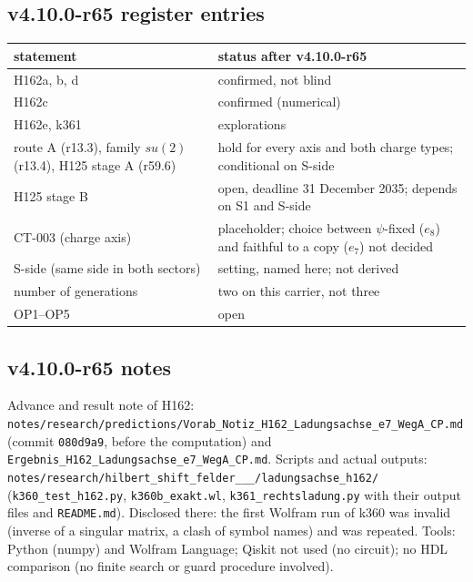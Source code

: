 \subsection*{v4.10.0-r65 register entries}
\label{subsec:v4100-r65-register}

\begin{center}
\small
\begin{tabular}{@{}>{\raggedright\arraybackslash}p{}>{\raggedright\arraybackslash}p{}@{}}
\toprule
statement & status after v4.10.0-r65\\
\midrule
H162a, b, d & confirmed, not blind\\
H162c & confirmed (numerical)\\
H162e, k361 & explorations\\
route A (r13.3), family \(su(2)\) (r13.4), H125 stage A (r59.6) & hold for every axis and both charge types; conditional on S-side\\
H125 stage B & open, deadline 31 December 2035; depends on S1 and S-side\\
CT-003 (charge axis) & placeholder; choice between \(\psi\)-fixed (\(e_8\)) and faithful to a copy (\(e_7\)) not decided\\
S-side (same side in both sectors) & setting, named here; not derived\\
number of generations & two on this carrier, not three\\
OP1--OP5 & open\\
\bottomrule
\end{tabular}
\end{center}

\subsection*{v4.10.0-r65 notes}
\label{subsec:v4100-r65-notes}

{\raggedright
Advance and result note of H162: \texttt{notes/\allowbreak research/\allowbreak predictions/\allowbreak Vorab\_\allowbreak Notiz\_\allowbreak H162\_\allowbreak Ladungsachse\_\allowbreak e7\_\allowbreak WegA\_\allowbreak CP.md}
(commit \texttt{080d9a9}, before the computation) and \texttt{Ergebnis\_\allowbreak H162\_\allowbreak Ladungsachse\_\allowbreak e7\_\allowbreak WegA\_\allowbreak CP.md}.
Scripts and actual outputs: \texttt{notes/\allowbreak research/\allowbreak hilbert\_\allowbreak shift\_\allowbreak felder\_\_\_/\allowbreak ladungsachse\_\allowbreak h162/}
(\texttt{k360\_\allowbreak test\_\allowbreak h162.py}, \texttt{k360b\_\allowbreak exakt.wl}, \texttt{k361\_\allowbreak rechtsladung.py} with their output files and \texttt{README.md}).
Disclosed there: the first Wolfram run of k360 was invalid (inverse of a singular matrix, a clash of symbol names) and was repeated.
Tools: Python (numpy) and Wolfram Language; Qiskit not used (no circuit); no HDL comparison (no finite search or guard procedure involved).
\par}

